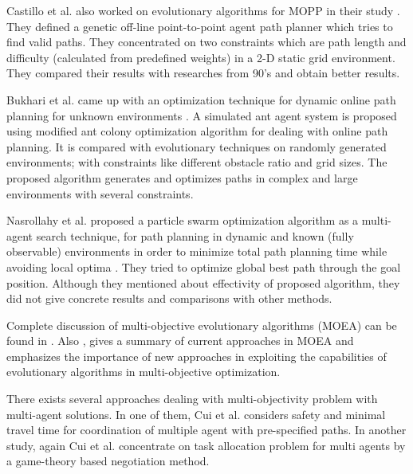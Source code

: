 \documentclass[10pt,journal]{IEEEtran}
\begin{document}
Castillo et al. also worked on evolutionary algorithms for MOPP in their study \cite{Castillo:2007}. They defined a genetic off-line point-to-point agent path planner which tries to find valid paths. They concentrated on two constraints which are path length and difficulty (calculated from predefined weights) in a 2-D static grid environment. They compared their results with researches from 90's and obtain better results.

Bukhari et al. came up with an optimization technique for dynamic online path planning for unknown environments \cite{Bukhari:2010}. A simulated ant agent system is proposed using modified ant colony optimization algorithm for dealing with online path planning. It is compared with evolutionary techniques on randomly generated environments; with constraints like different obstacle ratio and grid sizes. The proposed algorithm generates and optimizes paths in complex and large environments with several constraints.

Nasrollahy et al. proposed a particle swarm optimization algorithm as a multi-agent search technique, for path planning in dynamic and known (fully observable) environments in order to minimize total path planning time while avoiding local optima \cite{Nasrollahy:2009}. They tried to optimize global best path through the goal position. Although they mentioned about effectivity of proposed algorithm, they did not give concrete results and comparisons with other methods.

Complete discussion of multi-objective evolutionary algorithms (MOEA) can be found in \cite{MOOUEA}. Also \cite{Coello:2000}, gives a summary of current approaches in MOEA and emphasizes the importance of new approaches in exploiting the capabilities of evolutionary algorithms in multi-objective optimization.

There exists several approaches dealing with multi-objectivity problem with multi-agent solutions. In one of them, Cui et al. \cite{Cui:2012} considers safety and minimal travel time for coordination of multiple agent with pre-specified paths. %
In another study, again Cui et al. \cite{Cui:2013} concentrate on task allocation problem for multi agents by a game-theory based negotiation method.%
\end{document}
